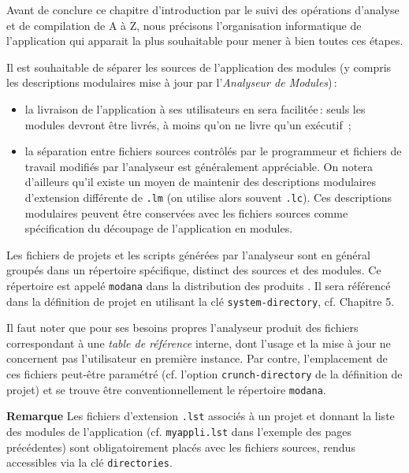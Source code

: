 
Avant de conclure ce chapitre d'introduction par le suivi
des op\'{e}rations d'analyse et de compilation de A \`{a} Z, nous
pr\'{e}cisons l'organisation informatique de l'application qui
apparait la plus souhaitable pour mener \`{a} bien toutes
ces \'{e}tapes.


Il est souhaitable de s\'{e}parer les sources de l'application
des modules (y compris les descriptions modulaires 
mise \`{a} jour par l'{\em Analyseur de Modules})\,:
\begin{itemize}
\item la livraison de l'application \`{a} ses utilisateurs en
sera facilit\'{e}e\,: seuls les modules devront \^{e}tre livr\'{e}s,
\`{a} moins qu'on ne livre qu'un ex\'{e}cutif \,;
\item la s\'{e}paration entre fichiers sources contr\^{o}l\'{e}s par
le programmeur et fichiers de travail modifi\'{e}s par l'analyseur
est g\'{e}n\'{e}ralement appr\'{e}ciable.
On notera d'ailleurs qu'il existe un moyen de maintenir
des descriptions modulaires d'extension diff\'{e}rente
de {\tt .lm} (on utilise alors souvent {\tt .lc}).
Ces descriptions modulaires peuvent \^{e}tre conserv\'{e}es avec les
fichiers sources comme sp\'{e}cification du d\'{e}coupage de
l'application en modules.
\end{itemize}



Les fichiers de projets et les scripts g\'{e}n\'{e}r\'{e}es par l'analyseur
sont en g\'{e}n\'{e}ral group\'{e}s dans un r\'{e}pertoire sp\'{e}cifique,
distinct des sources et des modules.
Ce r\'{e}pertoire est appel\'{e} {\tt modana} dans la distribution des
produits \Ilog. Il sera r\'{e}f\'{e}renc\'{e} dans la d\'{e}finition de projet
en utilisant la cl\'{e} {\tt system-directory}, cf. Chapitre 5.

Il faut noter que pour ses besoins propres l'analyseur produit des
fichiers correspondant \`{a} une {\em table de r\'{e}f\'{e}rence} interne,
dont l'usage et la mise \`{a} jour ne concernent pas l'utilisateur
en premi\`{e}re instance.
Par contre, l'emplacement de ces fichiers peut-\^{e}tre param\'{e}tr\'{e}
(cf. l'option {\tt crunch-directory} de la d\'{e}finition de projet)
et se trouve \^{e}tre conventionnellement le r\'{e}pertoire 
{\tt modana}.

\begin{Side}{\bf Remarque}
Les fichiers d'extension {\tt .lst} associ\'{e}s \`{a} un projet et
donnant la liste des modules de l'application
(cf. {\tt myappli.lst} dans l'exemple des pages pr\'{e}c\'{e}dentes) sont 
obligatoirement plac\'{e}s avec les fichiers sources,
rendus accessibles via la cl\'{e} {\tt directories}.
\end{Side}



